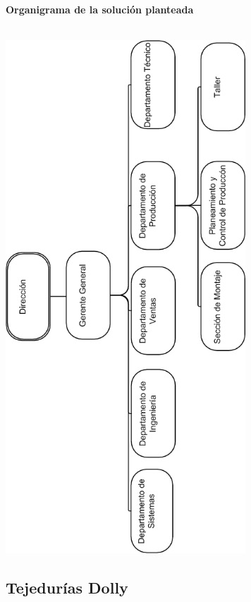 \documentclass[a4paper,10pt,titlepage]{article}
\begin{document}
\newpage
	\textbf{Organigrama de la solución planteada}\\\\
    \begin{center}
    \includegraphics[width=90mm]{./herculesBNSol.png}
    \end{center}



\newpage
\subsection{Tejedur\'ias Dolly}

\vspace{0.5cm}
\end{document}
